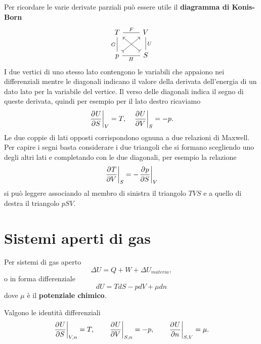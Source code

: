 \bigskip
\noindent
Per ricordare le varie derivate parziali pu\`o essere utile il \textbf{diagramma di Konis-Born}
\[\begin{tikzcd}
	T & V \\
	p & S
	\arrow["H"', no head, from=2-1, to=2-2]
	\arrow["F", no head, from=1-1, to=1-2]
	\arrow["U", no head, from=1-2, to=2-2]
	\arrow["G"', no head, from=1-1, to=2-1]
	\arrow[tail, from=2-1, to=1-2]
	\arrow[tail, from=2-2, to=1-1]
\end{tikzcd}\]
I due vertici di uno stesso lato contengono le variabili che appaiono nei differenziali mentre le diagonali indicano il valore della derivata dell'energia di un dato lato per la variabile del vertice. Il verso delle diagonali indica il segno di queste derivata, quindi per esempio per il lato destro ricaviamo
\[\ppb SUV=T,\quad \ppb VUS=-p.\]
Le due coppie di lati opposti corrispondono ognuna a due relazioni di Maxwell. Per capire i segni basta considerare i due triangoli che si formano scegliendo uno degli altri lati e completando con le due diagonali, per esempio la relazione
\[\ppb VTS=-\ppb SpV\]
si pu\`o leggere associando al membro di sinistra il triangolo $TVS$ e a quello di destra il triangolo $pSV$.

\section{Sistemi aperti di gas}
Per sistemi di gas aperto
\[\Delta U=Q+W+\Delta U_{materia},\]
o in forma differenziale
\[dU=TdS-pdV+\mu dn\]
dove $\mu$ \`e il \textbf{potenziale chimico}.
\begin{remark}
Valgono le identit\`a differenziali
\[\ppb SU{V,n}=T,\qquad \ppb VU{S,n}=-p,\qquad \ppb nU{S,V}=\mu.\]
\end{remark}
